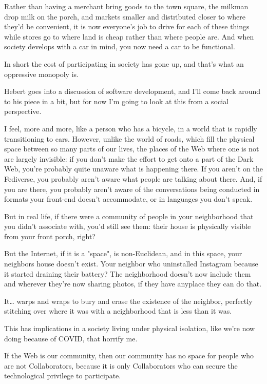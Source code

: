 \documentclass[11pt]{article}
\begin{document}
\begin{itemize}
Rather than having a merchant bring goods to the town square, the milkman drop milk on the porch, and markets smaller and distributed closer to where they'd be convenient, it is now everyone's job to drive for each of these things while stores go to where land is cheap rather than where people are. And when society develops with a car in mind, you now need a car to be functional.

In short the cost of participating in society has gone up, and that's what an oppressive monopoly is.

Hebert goes into a discussion of software development, and I'll come back around to his piece in a bit, but for now I'm going to look at this from a social perspective.

I feel, more and more, like a person who has a bicycle, in a world that is rapidly transitioning to cars. However, unlike the world of roads, which fill the physical space between so many parts of our lives, the places of the Web where one is not are largely invisible: if you don't make the effort to get onto a part of the Dark Web, you're probably quite unaware what is happening there. If you aren't on the Fediverse, you probably aren't aware what people are talking about there. And, if you are there, you probably aren't aware of the conversations being conducted in formats your front-end doesn't accommodate, or in languages you don't speak.

But in real life, if there were a community of people in your neighborhood that you didn't associate with, you'd still see them: their house is physically visible from your front porch, right?

But the Internet, if it is a "space", is non-Euclidean, and in this space, your neighbors house doesn't exist. Your neighbor who uninstalled Instagram because it started draining their battery? The neighborhood doesn't now include them and wherever they're now sharing photos, if they have anyplace they can do that.

It\ldots{} warps and wraps to bury and erase the existence of the neighbor, perfectly stitching over where it was with a neighborhood that is less than it was.

This has implications in a society living under physical isolation, like we're now doing because of COVID, that horrify me.

If the Web is our community, then our community has no space for people who are not Collaborators, because it is only Collaborators who can secure the technological privilege to participate.


\end{itemize}
\end{document}
